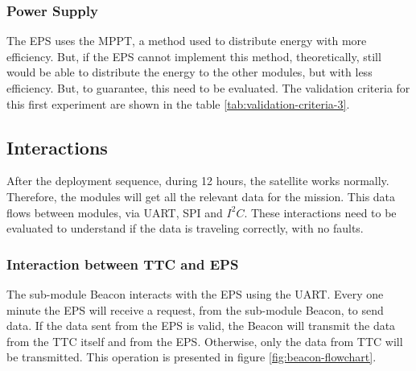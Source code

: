 \subsubsection{Power Supply}

The EPS uses the MPPT, a method used to distribute energy with more efficiency. But, if the EPS cannot implement this method, theoretically, still would be able to distribute the energy to the other modules, but with less efficiency. But, to guarantee, this need to be evaluated. The validation criteria for this first experiment are shown in the table \ref{tab:validation-criteria-3}.

\begin{table}[H]
	\centering
	\caption{Validation criteria.}
	\label{tab:validation-criteria-3}
\end{table}

\subsection{Interactions}

After the deployment sequence, during 12 hours, the satellite works normally. Therefore, the modules will get all the relevant data for the mission. This data flows between modules, via UART, SPI and $I^{2}C$. These interactions need to be evaluated to understand if the data is traveling correctly, with no faults. 

\subsubsection{Interaction between TTC and EPS}

The sub-module Beacon interacts with the EPS using the UART. Every one minute the EPS will receive a request, from the sub-module Beacon, to send data. If the data sent from the EPS is valid, the Beacon will transmit the data from the TTC itself and from the EPS. Otherwise, only the data from TTC will be transmitted. This operation is presented in figure \ref{fig:beacon-flowchart}.  

